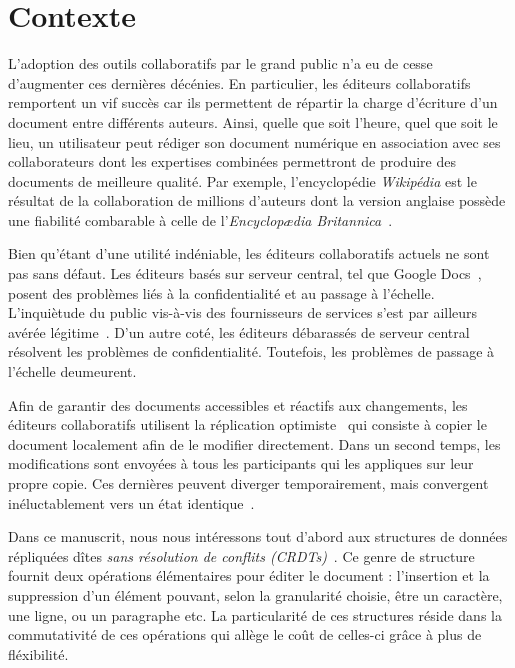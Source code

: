 
\section{Contexte}

L'adoption des outils collaboratifs par le grand public n'a eu de cesse
d'augmenter ces dernières décénies. En particulier, les éditeurs
collaboratifs~\cite{ellis1991groupware} remportent un vif succès car ils
permettent de répartir la charge d'écriture d'un document entre différents
auteurs. Ainsi, quelle que soit l'heure, quel que soit le lieu, un utilisateur
peut rédiger son document numérique en association avec ses collaborateurs dont
les expertises combinées permettront de produire des documents de meilleure
qualité. Par exemple, l'encyclopédie \emph{Wikipédia} est le résultat de la
collaboration de millions d'auteurs dont la version anglaise possède une
fiabilité combarable à celle de l'\emph{Encyclop\ae{}dia
Britannica}~\cite{giles2005internet}.

Bien qu'étant d'une utilité indéniable, les éditeurs collaboratifs actuels ne
sont pas sans défaut. Les éditeurs basés sur serveur central, tel que Google
Docs~\cite{nichols1995high}, posent des problèmes liés à la confidentialité et
au passage à l'échelle. L'inquiètude du public vis-à-vis des fournisseurs de
services s'est par ailleurs avérée légitime~\cite{gellman2013us}. D'un autre
coté, les éditeurs débarassés de serveur central résolvent les problèmes de
confidentialité. Toutefois, les problèmes de passage à l'échelle deumeurent.

Afin de garantir des documents accessibles et réactifs aux changements, les
éditeurs collaboratifs utilisent la réplication
optimiste~\cite{saito2005optimistic} qui consiste à copier le document
localement afin de le modifier directement. Dans un second temps, les
modifications sont envoyées à tous les participants qui les appliques sur leur
propre copie.  Ces dernières peuvent diverger temporairement, mais convergent
inéluctablement vers un état identique~\cite{bailis2013eventual}.

Dans ce manuscrit, nous nous intéressons tout d'abord aux structures de données
répliquées dîtes \emph{sans résolution de conflits
(CRDTs)}~\cite{shapiro2011comprehensive, shapiro2011conflict}. Ce genre de
structure~\cite{ahmed2011evaluating, andre2013supporting, conway2014language,
grishchenko2010deep, oster2006data, preguica2009commutative, roh2011replicated,
weiss2007wooki, weiss2009logoot, wu2010partial, yu2012stringwise} fournit deux
opérations élémentaires pour éditer le document : l'insertion et la suppression
d'un élément pouvant, selon la granularité choisie, être un caractère, une
ligne, ou un paragraphe etc. La particularité de ces structures réside dans la
commutativité de ces opérations qui allège le coût de celles-ci grâce à plus de
fléxibilité.


